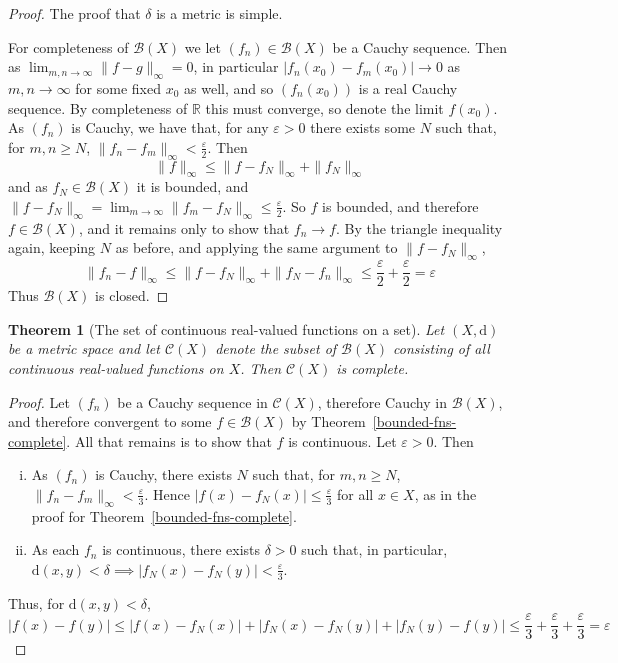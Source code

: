 \documentclass[10pt,fleqn]{article}
\newcommand{\met}{\mathrm{d}}
\newcommand{\reals}{\mathbb{R}}
\newcommand{\eps}{\varepsilon}
\theoremstyle{definition} \newtheorem{defn}{Definition}[section]
\theoremstyle{plain}      \newtheorem{thm}[defn]{Theorem}
\theoremstyle{definition} \newtheorem{prop}[defn]{Proposition}
\theoremstyle{definition} \newtheorem{cor}[defn]{Corollary}
\theoremstyle{definition} \newtheorem{ex}[defn]{Example}
\theoremstyle{definition} \newtheorem{rem}[defn]{Remark}
\begin{document}
\begin{proof}
    The proof that $\delta$ is a metric is simple.

    For completeness of $\mathcal{B}(X)$ we let $(f_n)\in\mathcal{B}(X)$ be a Cauchy sequence.
    Then as $\lim_{m,n\to\infty}\|f-g\|_{\infty}=0$, in particular \mbox{$|f_n(x_0)-f_m(x_0)|\to0$} as $m,n\to\infty$ for some fixed $x_0$ as well, and so $(f_n(x_0))$ is a real Cauchy sequence.
    By completeness of $\reals$ this must converge, so denote the limit $f(x_0)$.
    As $(f_n)$ is Cauchy, we have that, for any $\eps>0$ there exists some $N$ such that, for $m,n\geq N$, $\|f_n-f_m\|_{\infty}<\frac{\eps}{2}$.
    Then
    \[
        \|f\|_{\infty}\leq
        \|f-f_N\|_{\infty} + \|f_N\|_{\infty}
    \]
    and as $f_N\in\mathcal{B}(X)$ it is bounded, and $\|f-f_N\|_{\infty}=\lim_{m\to\infty}\|f_m-f_N\|_{\infty}\leq\frac{\eps}{2}$.
    So $f$ is bounded, and therefore $f\in\mathcal{B}(X)$, and it remains only to show that $f_n\to f$.
    By the triangle inequality again, keeping $N$ as before, and applying the same argument to $\|f-f_N\|_{\infty}$,
    \[
        \|f_n-f\|_{\infty}\leq
        \|f-f_N\|_{\infty}+\|f_N-f_n\|_{\infty}\leq
        \frac{\eps}{2}+\frac{\eps}{2}
        =\eps
    \]
    Thus $\mathcal{B}(X)$ is closed.
\end{proof}

\begin{thm}[The set of continuous real-valued functions on a set]
    Let $(X,\met)$ be a metric space and let $\mathcal{C}(X)$ denote the subset of $\mathcal{B}(X)$ consisting of all continuous real-valued functions on $X$.
    Then $\mathcal{C}(X)$ is complete.
\end{thm}

\begin{proof}
    Let $(f_n)$ be a Cauchy sequence in $\mathcal{C}(X)$, therefore Cauchy in $\mathcal{B}(X)$, and therefore convergent to some $f\in\mathcal{B}(X)$ by Theorem~\ref{bounded-fns-complete}.
    All that remains is to show that $f$ is continuous.
    Let $\eps>0$.
    Then
    \begin{enumerate}[(i)]
        \item As $(f_n)$ is Cauchy, there exists $N$ such that, for $m,n\geq N$, $\|f_n-f_m\|_{\infty}<\frac{\eps}{3}$.
        Hence $|f(x)-f_N(x)|\leq\frac{\eps}{3}$ for all $x\in X$, as in the proof for Theorem~\ref{bounded-fns-complete}.
        \item As each $f_n$ is continuous, there exists $\delta>0$ such that, in particular, $\met(x,y)<\delta\implies|f_N(x)-f_N(y)|<\frac{\eps}{3}$.
    \end{enumerate}
    Thus, for $\met(x,y)<\delta$,
    \[
        |f(x)-f(y)|\leq
        |f(x)-f_N(x)|+|f_N(x)-f_N(y)|+|f_N(y)-f(y)|\leq
        \frac{\eps}{3}+\frac{\eps}{3}+\frac{\eps}{3}=
        \eps
    \]
\end{proof}
\end{document}
